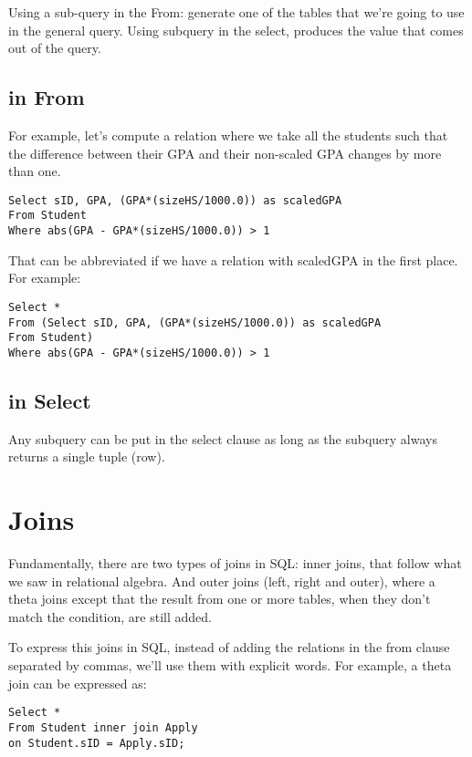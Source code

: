 \documentclass[11pt, oneside]{article}   	%
\begin{document}
Using a sub-query in the From: generate one of the tables that we're going to use in the general query. Using subquery in the select, produces the value that comes out of the query. 

\subsection{in From}

For example, let's compute a relation where we take all the students such that the difference between their GPA and their non-scaled GPA changes by more than one.

\begin{lstlisting}
Select sID, GPA, (GPA*(sizeHS/1000.0)) as scaledGPA
From Student
Where abs(GPA - GPA*(sizeHS/1000.0)) > 1
\end{lstlisting}

That can be abbreviated if we have a relation with scaledGPA in the first place. For example:

\begin{lstlisting}
Select *
From (Select sID, GPA, (GPA*(sizeHS/1000.0)) as scaledGPA
From Student)
Where abs(GPA - GPA*(sizeHS/1000.0)) > 1
\end{lstlisting}

\subsection{in Select}

Any subquery can be put in the select clause as long as the subquery always returns a single tuple (row). 

\section{Joins}

Fundamentally, there are two types of joins in SQL: inner joins, that follow what we saw in relational algebra. And outer joins (left, right and outer), where a theta joins except that the result from one or more tables, when they don't match the condition, are still added. 

To express this joins in SQL, instead of adding the relations in the from clause separated by commas, we'll use them with explicit words. For example, a theta join can be expressed as:

\begin{lstlisting}
Select *
From Student inner join Apply
on Student.sID = Apply.sID;
\end{lstlisting}
\end{document}
